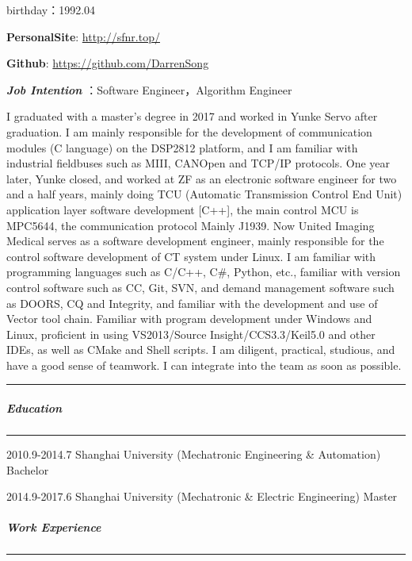 \documentclass[
]{article}
\begin{document}
\begin{CJK}{UTF8}{gbsn}
birthday：1992.04

\textbf{PersonalSite}: \url{http://sfnr.top/}

\textbf{Github}: \url{https://github.com/DarrenSong}

\emph{\textbf{Job Intention}} ：Software Engineer，Algorithm Engineer

I graduated with a master's degree in 2017 and worked in Yunke Servo
after graduation. I am mainly responsible for the development of
communication modules (C language) on the DSP2812 platform, and I am
familiar with industrial fieldbuses such as MIII, CANOpen and TCP/IP
protocols. One year later, Yunke closed, and worked at ZF as an
electronic software engineer for two and a half years, mainly doing TCU
(Automatic Transmission Control End Unit) application layer software
development {[}C++{]}, the main control MCU is MPC5644, the
communication protocol Mainly J1939. Now United Imaging Medical serves
as a software development engineer, mainly responsible for the control
software development of CT system under Linux. I am familiar with
programming languages such as C/C++, C\#, Python, etc., familiar with
version control software such as CC, Git, SVN, and demand management
software such as DOORS, CQ and Integrity, and familiar with the
development and use of Vector tool chain. Familiar with program
development under Windows and Linux, proficient in using VS2013/Source
Insight/CCS3.3/Keil5.0 and other IDEs, as well as CMake and Shell
scripts. I am diligent, practical, studious, and have a good sense of
teamwork. I can integrate into the team as soon as possible.

\begin{center}\rule{0.5\linewidth}{0.5pt}\end{center}

\hypertarget{education}{%
\subparagraph{Education}\label{education}}

\begin{center}\rule{0.5\linewidth}{0.5pt}\end{center}

    
        2010.9-2014.7
        Shanghai University  (Mechatronic Engineering \& Automation)
        Bachelor
    
        
        2014.9-2017.6
        Shanghai University  (Mechatronic \& Electric Engineering)
         Master
    

\hypertarget{work-experience}{%
\subparagraph{Work Experience}\label{work-experience}}

\begin{center}\rule{0.5\linewidth}{0.5pt}\end{center}


\end{CJK}
\end{document}
